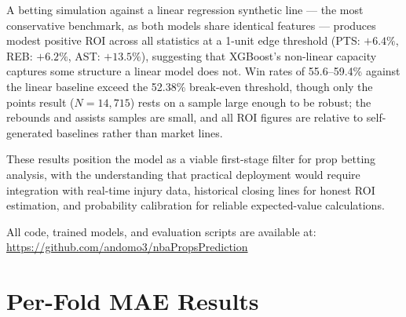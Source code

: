 \documentclass[12pt, letterpaper]{article}
\begin{document}
A betting simulation against a linear regression synthetic line --- the most
conservative benchmark, as both models share identical features --- produces
modest positive ROI across all statistics at a 1-unit edge threshold
(PTS: $+6.4\%$, REB: $+6.2\%$, AST: $+13.5\%$), suggesting that XGBoost's
non-linear capacity captures some structure a linear model does not.
Win rates of 55.6--59.4\% against the linear baseline exceed the 52.38\%
break-even threshold, though only the points result ($N=14{,}715$) rests
on a sample large enough to be robust; the rebounds and assists samples
are small, and all ROI figures are relative to self-generated baselines
rather than market lines.

These results position the model as a viable first-stage filter for prop
betting analysis, with the understanding that practical deployment would
require integration with real-time injury data, historical closing lines
for honest ROI estimation, and probability calibration for reliable
expected-value calculations.

All code, trained models, and evaluation scripts are available at:
\url{https://github.com/andomo3/nbaPropsPrediction}

\newpage



\appendix

\section{Per-Fold MAE Results}
\label{app:folds}
\end{document}

